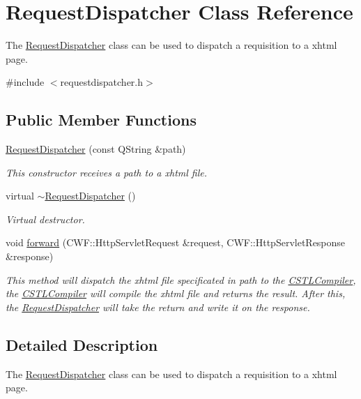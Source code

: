 \hypertarget{class_request_dispatcher}{}\section{Request\+Dispatcher Class Reference}
\label{class_request_dispatcher}


The \hyperlink{class_request_dispatcher}{Request\+Dispatcher} class can be used to dispatch a requisition to a xhtml page.  




{\ttfamily \#include $<$requestdispatcher.\+h$>$}

\subsection*{Public Member Functions}
\begin{DoxyCompactItemize}
\item 
\hyperlink{class_request_dispatcher_accb486106fd9d814d44222594a174fbb}{Request\+Dispatcher} (const Q\+String \&path)
\begin{DoxyCompactList}\small\item\em This constructor receives a path to a xhtml file. \end{DoxyCompactList}\item 
virtual \hyperlink{class_request_dispatcher_a1b09805ab31a0f96d9823a2bf9de3771}{$\sim$\+Request\+Dispatcher} ()
\begin{DoxyCompactList}\small\item\em Virtual destructor. \end{DoxyCompactList}\item 
void \hyperlink{class_request_dispatcher_aa3ccc7d3debc6555da0f6e437cfb036e}{forward} (C\+W\+F\+::\+Http\+Servlet\+Request \&request, C\+W\+F\+::\+Http\+Servlet\+Response \&response)
\begin{DoxyCompactList}\small\item\em This method will dispatch the xhtml file specificated in path to the \hyperlink{class_c_s_t_l_compiler}{C\+S\+T\+L\+Compiler}, the \hyperlink{class_c_s_t_l_compiler}{C\+S\+T\+L\+Compiler} will compile the xhtml file and returns the result. After this, the \hyperlink{class_request_dispatcher}{Request\+Dispatcher} will take the return and write it on the response. \end{DoxyCompactList}\end{DoxyCompactItemize}


\subsection{Detailed Description}
The \hyperlink{class_request_dispatcher}{Request\+Dispatcher} class can be used to dispatch a requisition to a xhtml page. 

